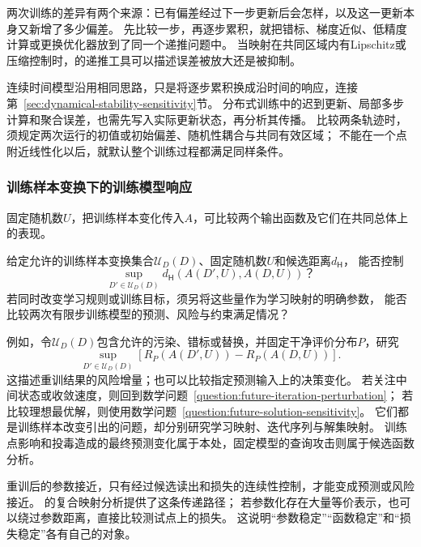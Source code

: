 两次训练的差异有两个来源：已有偏差经过下一步更新后会怎样，以及这一更新本身又新增了多少偏差。
先比较一步，再逐步累积，就把错标、梯度近似、低精度计算或更换优化器放到了同一个递推问题中。
当映射在共同区域内有Lipschitz或压缩控制时，的递推工具可以描述误差被放大还是被抑制。

连续时间模型沿用相同思路，只是将逐步累积换成沿时间的响应，连接第~\ref{sec:dynamical-stability-sensitivity}节。
分布式训练中的迟到更新、局部多步计算和聚合误差，也需先写入实际更新状态，再分析其传播。
比较两条轨迹时，须规定两次运行的初值或初始偏差、随机性耦合与共同有效区域；
不能在一个点附近线性化以后，就默认整个训练过程都满足同样条件。

\subsubsection{训练样本变换下的训练模型响应}
\label{sec:future-analysis-perturbation-map}

固定随机数$U$，把训练样本变化传入$A$，可比较两个输出函数及它们在共同总体上的表现。

\begin{mathproblem}[训练样本变换造成的训练模型差异]
  \label{question:future-perturbation-map}
  给定允许的训练样本变换集合$\mathcal U_D(D)$、固定随机数$U$和候选距离$d_{\mathsf H}$，
  能否控制
  \[
    \sup_{D'\in\mathcal U_D(D)}
      d_{\mathsf H}(A(D',U),A(D,U))\text{？}
  \]
  若同时改变学习规则或训练目标，须另将这些量作为学习映射的明确参数，
  能否比较两次有限步训练模型的预测、风险与约束满足情况？
\end{mathproblem}

例如，令$\mathcal U_D(D)$包含允许的污染、错标或替换，并固定干净评价分布$P$，研究
\begin{equation}
  \sup_{D'\in\mathcal U_D(D)}
  \left[R_P(A(D',U))-R_P(A(D,U))\right].
  \label{eq:future-training-robustness-question}
\end{equation}
这描述重训结果的风险增量；也可以比较指定预测输入上的决策变化。
若关注中间状态或收敛速度，则回到数学问题~\ref{question:future-iteration-perturbation}；
若比较理想最优解，则使用数学问题~\ref{question:future-solution-sensitivity}。
它们都是训练样本改变引出的问题，却分别研究学习映射、迭代序列与解集映射。
训练点影响和投毒造成的最终预测变化属于本处，固定模型的查询攻击则属于候选函数分析。

重训后的参数接近，只有经过候选读出和损失的连续性控制，才能变成预测或风险接近。
的复合映射分析提供了这条传递路径；
若参数化存在大量等价表示，也可以绕过参数距离，直接比较测试点上的损失。
这说明“参数稳定”“函数稳定”和“损失稳定”各有自己的对象。

